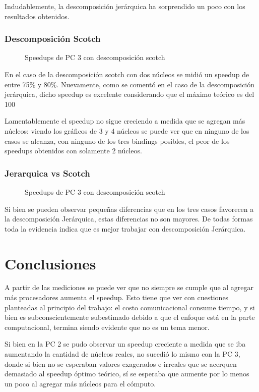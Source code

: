 \documentclass{article}
\begin{document}
Indudablemente, la descomposición jerárquica ha sorprendido un poco con los resultados obtenidos.

\subsubsection{Descomposición Scotch}
\begin{figure}[H]
    
    \caption{Speedups de PC 3 con descomposición scotch}
\end{figure}
En el caso de la descomposición scotch con dos núcleos se midió un speedup de entre 75\% y 80\%. Nuevamente, como se comentó en el caso de la descomposición jerárquica, dicho speedup es excelente considerando que el máximo teórico es del 100%

Lamentablemente el speedup no sigue creciendo a medida que se agregan más núcleos: viendo los gráficos de 3 y 4 núcleos se puede ver que en ninguno de los casos se alcanza, con ninguno de los tres bindings posibles, el peor de los speedups obtenidos con solamente 2 núcleos.

\subsubsection{Jerarquica vs Scotch}
\begin{figure}[H]
    
    \caption{Speedups de PC 3 con descomposición scotch}
\end{figure}
Si bien se pueden observar pequeñas diferencias que en los tres casos favorecen a la descomposición Jerárquica, estas diferencias no son mayores. De todas formas toda la evidencia indica que es mejor trabajar con descomposición Jerárquica.

\newpage
\section{Conclusiones}
A partir de las mediciones se puede ver que no siempre se cumple que al agregar más procesadores aumenta el speedup. Esto tiene que ver con cuestiones planteadas al principio del trabajo: el costo comunicacional consume tiempo, y si bien es subconscientemente subestimado debido a que el enfoque está en la parte computacional, termina siendo evidente que no es un tema menor. 

Si bien en la PC 2 se pudo observar un speedup creciente a medida que se iba aumentando la cantidad de núcleos reales, no sucedió lo mismo con la PC 3, donde si bien no se esperaban valores exagerados e irreales que se acerquen demasiado al speedup óptimo teórico, sí se esperaba que aumente por lo menos un poco al agregar más núcleos para el cómputo.
\end{document}
